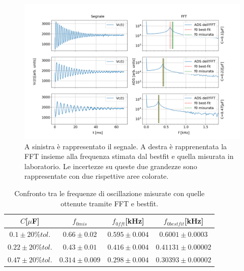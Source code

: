 \documentclass{article}
\begin{document}
        \begin{figure}[H]
            \centering
            \includegraphics[width=\textwidth]{FFT12/FFTRLC.png}
            \caption{A sinistra è rappresentato il segnale. A destra è rapprenentata la FFT insieme
            alla frequenza stimata dal bestfit e quella misurata in laboratorio.
            Le incertezze su queste due grandezze sono rappresentate con due rispettive aree colorate.
            }
            \label{fig:osc_smor}
        \end{figure}

        \begin{table}[H]
            \centering
            
                \begin{tabular}{cccc}
                    $C$[$\mu$F]          &$f_{0mis}$                &   $f_{0fft}$[kHz]       & $f_{0bestfit}$[kHz] \\
                    \hline
                    $0.1 \pm 20\%tol.$   &     $0.66 \pm 0.02$      & $0.595 \pm 0.004$       & $0.6001 \pm 0.0003$ \\
                    $0.22 \pm 20\%tol.$  &$0.43 \pm 0.01$           & $0.416 \pm 0.004$       & $0.41131\pm 0.00002$ \\
                    $0.47 \pm 20\%tol.$  &$0.314 \pm 0.009 $        &$0.298 \pm 0.004$        & $0.30393\pm 0.00002$ \\
                \end{tabular}
                \label{tab:osc_smor}
                \caption{Confronto tra le frequenze di oscillazione misurate 
                con quelle ottenute tramite FFT e bestfit.}
        \end{table}
    
\end{document}
